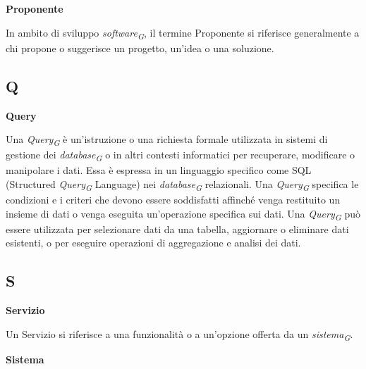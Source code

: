 \vspace{0.4cm}

\textbf{Proponente}

\vspace{0.1cm}

In ambito di sviluppo \textit{software}\textsubscript{\textit{G}}, il termine Proponente si riferisce generalmente a chi propone o suggerisce un progetto, un'idea o una soluzione.

\subsection{Q}

\vspace{0.4cm}

\textbf{Query}

\vspace{0.1cm}

Una \textit{Query}\textsubscript{\textit{G}} è un'istruzione o una richiesta formale utilizzata in sistemi di gestione dei \textit{database}\textsubscript{\textit{G}} o in altri contesti informatici per recuperare, modificare o manipolare i dati. Essa è espressa in un linguaggio specifico come SQL (Structured \textit{Query}\textsubscript{\textit{G}} Language) nei \textit{database}\textsubscript{\textit{G}} relazionali. Una \textit{Query}\textsubscript{\textit{G}} specifica le condizioni e i criteri che devono essere soddisfatti affinché venga restituito un insieme di dati o venga eseguita un'operazione specifica sui dati. Una \textit{Query}\textsubscript{\textit{G}} può essere utilizzata per selezionare dati da una tabella, aggiornare o eliminare dati esistenti, o per eseguire operazioni di aggregazione e analisi dei dati.

\subsection{S}

\vspace{0.4cm}

\textbf{Servizio}

\vspace{0.1cm}

Un Servizio si riferisce a una funzionalità o a un'opzione offerta da un \textit{sistema}\textsubscript{\textit{G}}.

\vspace{0.4cm}

\textbf{Sistema}

